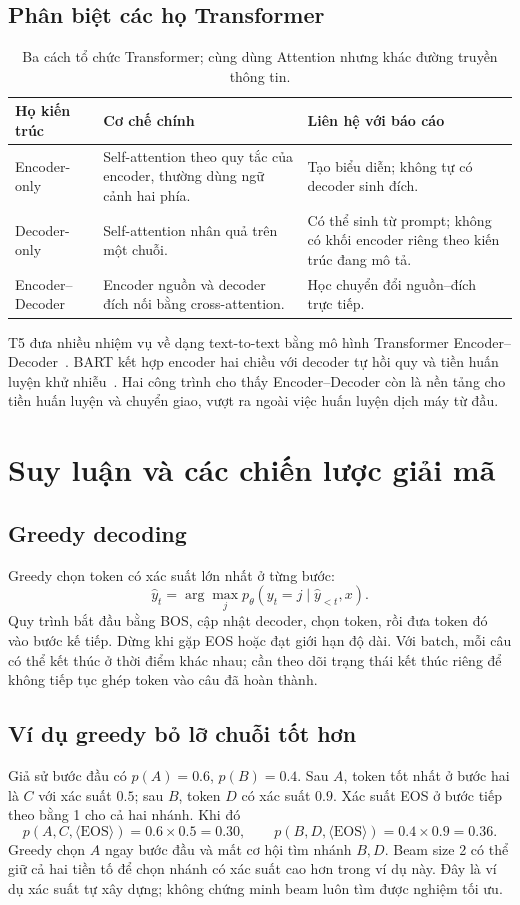 \documentclass[11pt,a4paper]{article}
\numberwithin{equation}{section}
\newcommand{\EOS}{\langle\mathrm{EOS}\rangle}
\begin{document}
\subsection{Phân biệt các họ Transformer}
\begin{table}[H]
\centering\small
\begin{tabularx}{\linewidth}{@{}p{3cm}YY@{}}
\toprule{}Họ kiến trúc & Cơ chế chính & Liên hệ với báo cáo\\\midrule
Encoder-only & Self-attention theo quy tắc của encoder, thường dùng ngữ cảnh hai phía. & Tạo biểu diễn; không tự có decoder sinh đích.\\
Decoder-only & Self-attention nhân quả trên một chuỗi. & Có thể sinh từ prompt; không có khối encoder riêng theo kiến trúc đang mô tả.\\
Encoder--Decoder & Encoder nguồn và decoder đích nối bằng cross-attention. & Học chuyển đổi nguồn--đích trực tiếp.\\
\bottomrule
\end{tabularx}
\caption{Ba cách tổ chức Transformer; cùng dùng Attention nhưng khác đường truyền thông tin.}
\end{table}
T5 đưa nhiều nhiệm vụ về dạng text-to-text bằng mô hình Transformer Encoder--Decoder~\cite{t5}. BART kết hợp encoder hai chiều với decoder tự hồi quy và tiền huấn luyện khử nhiễu~\cite{bart}. Hai công trình cho thấy Encoder--Decoder còn là nền tảng cho tiền huấn luyện và chuyển giao, vượt ra ngoài việc huấn luyện dịch máy từ đầu.

\section{Suy luận và các chiến lược giải mã}
\subsection{Greedy decoding}
Greedy chọn token có xác suất lớn nhất ở từng bước:
\begin{equation}
\hat y_t=\arg\max_j p_\theta(y_t=j\mid\hat y_{<t},x).
\end{equation}
Quy trình bắt đầu bằng BOS, cập nhật decoder, chọn token, rồi đưa token đó vào bước kế tiếp. Dừng khi gặp EOS hoặc đạt giới hạn độ dài. Với batch, mỗi câu có thể kết thúc ở thời điểm khác nhau; cần theo dõi trạng thái kết thúc riêng để không tiếp tục ghép token vào câu đã hoàn thành.

\subsection{Ví dụ greedy bỏ lỡ chuỗi tốt hơn}
Giả sử bước đầu có $p(A)=0.6$, $p(B)=0.4$. Sau $A$, token tốt nhất ở bước hai là $C$ với xác suất $0.5$; sau $B$, token $D$ có xác suất $0.9$. Xác suất EOS ở bước tiếp theo bằng 1 cho cả hai nhánh. Khi đó
\begin{equation*}
p(A,C,\EOS)=0.6\times0.5=0.30,
\qquad p(B,D,\EOS)=0.4\times0.9=0.36.
\end{equation*}
Greedy chọn $A$ ngay bước đầu và mất cơ hội tìm nhánh $B,D$. Beam size 2 có thể giữ cả hai tiền tố để chọn nhánh có xác suất cao hơn trong ví dụ này. Đây là ví dụ xác suất tự xây dựng; không chứng minh beam luôn tìm được nghiệm tối ưu.
\end{document}
